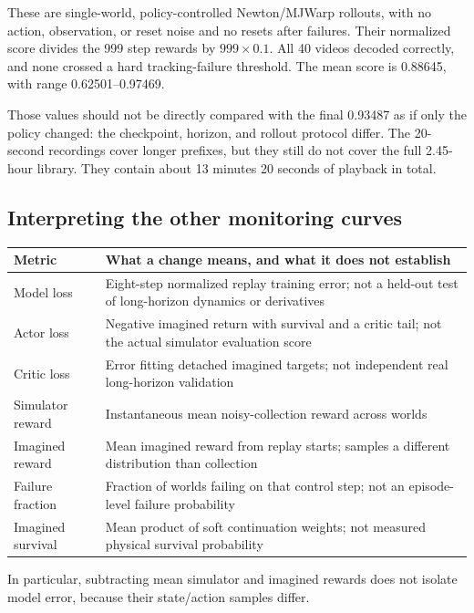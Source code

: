 \documentclass[11pt,a4paper]{article}
\begin{document}
These are single-world, policy-controlled Newton/MJWarp rollouts, with no action,
observation, or reset noise and no resets after failures. Their normalized score
divides the 999 step rewards by $999\times0.1$. All 40 videos decoded correctly,
and none crossed a hard tracking-failure threshold. The mean score is 0.88645,
with range 0.62501--0.97469.

Those values should not be directly compared with the final 0.93487 as if only
the policy changed: the checkpoint, horizon, and rollout protocol differ. The
20-second recordings cover longer prefixes, but they still do not cover the full
2.45-hour library. They contain about 13 minutes 20 seconds of playback in total.

\subsection{Interpreting the other monitoring curves}
\begin{tabularx}{\linewidth}{@{}lX@{}}
\toprule
Metric & What a change means, and what it does not establish\\
\midrule
Model loss & Eight-step normalized replay training error; not a held-out test
of long-horizon dynamics or derivatives\\
Actor loss & Negative imagined return with survival and a critic tail; not the
actual simulator evaluation score\\
Critic loss & Error fitting detached imagined targets; not independent real
long-horizon validation\\
Simulator reward & Instantaneous mean noisy-collection reward across worlds\\
Imagined reward & Mean imagined reward from replay starts; samples a different
distribution than collection\\
Failure fraction & Fraction of worlds failing on that control step; not an
episode-level failure probability\\
Imagined survival & Mean product of soft continuation weights; not measured
physical survival probability\\
\bottomrule
\end{tabularx}
In particular, subtracting mean simulator and imagined rewards does not isolate
model error, because their state/action samples differ.
\end{document}
